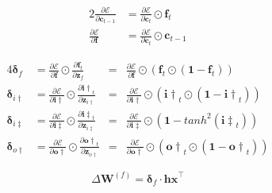 \documentclass[xcolor={table}]{beamer}
\begin{document}
 \begin{frame} 
\begin{alignat}{2}
\frac{\partial \mathcal{E}}{\partial \mathbf{c}_{t-1}} & = \frac{\partial \mathcal{E}}{\partial \mathbf{c}_t} \odot \mathbf{f}_t \label{eqn:gradientcellold}\\
\frac{\partial \mathcal{E}}{\partial \mathbf{f}} & = \frac{\partial \mathcal{E}}{\partial \mathbf{c}_t} \odot \mathbf{c}_{t{-}1} \label{eqn:gradientforgetmask}
\end{alignat}
\end{frame} 



 \begin{frame} 
\begin{alignat}{4}
	\mathbf{\delta}_f & = \frac{\partial \mathcal{E}}{\partial \mathbf{f}} \odot \frac{\partial \mathbf{f}_t}{\partial \mathbf{z}_f}  &= &\frac{\partial \mathcal{E}}{\partial \mathbf{f}} \odot \left( \mathbf{f}_t \odot \left(\mathbf{1} - \mathbf{f}_t\right)  \right) \label{eqn:forgetdelta}\\
	\mathbf{\delta}_{i\dagger} & = \frac{\partial \mathcal{E}}{\partial \mathbf{i\dagger}} \odot \frac{\partial \mathbf{i\dagger}_t}{\partial \mathbf{z}_{i\dagger}}  &= & \frac{\partial \mathcal{E}}{\partial \mathbf{i\dagger}} \odot \left( \mathbf{i\dagger}_t \odot \left(\mathbf{1} - \mathbf{i\dagger}_t\right)  \right) \label{eqn:idaggerdelta}\\
	\mathbf{\delta}_{i\ddagger} & = \frac{\partial \mathcal{E}}{\partial \mathbf{i\ddagger}} \odot \frac{\partial \mathbf{i\ddagger}_t}{\partial \mathbf{z}_{i\ddagger}}  &= & \frac{\partial \mathcal{E}}{\partial \mathbf{i\ddagger}} \odot \left(\mathbf{1} - tanh^2(\mathbf{i\ddagger}_t)  \right) \label{eqn:idoubledaggerdelta}\\
	\mathbf{\delta}_{o\dagger} & = \frac{\partial \mathcal{E}}{\partial \mathbf{o\dagger}} \odot \frac{\partial \mathbf{o\dagger}_t}{\partial \mathbf{z}_{o\dagger}}  &= & \frac{\partial \mathcal{E}}{\partial \mathbf{o\dagger}} \odot \left( \mathbf{o\dagger}_t \odot \left(\mathbf{1} - \mathbf{o\dagger}_t\right)  \right) \label{eqn:odaggerdelta}\end{alignat}
\end{frame} 



 \begin{frame} 
\begin{equation}
\Delta \mathbf{W}^{(f)} = \mathbf{\delta}_f \cdot \mathbf{hx}^\intercal
\end{equation}
\end{frame} 
\end{document}
